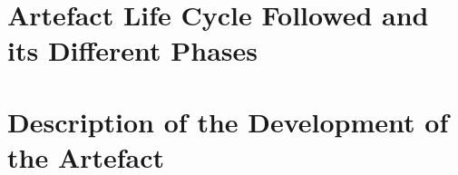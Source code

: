 \section{Artefact Life Cycle Followed and its Different Phases}

\section{Description of the Development of the Artefact}



